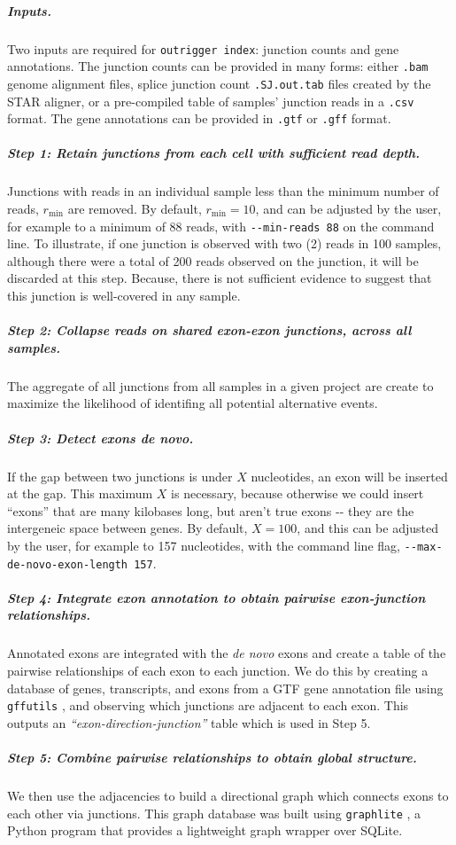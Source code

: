 \subparagraph{Inputs.} Two inputs are required for \texttt{outrigger index}: junction counts and gene annotations. The junction counts can be provided in many forms: either \texttt{.bam} \cite{Group:OEYDIUUE} genome alignment files, splice junction count \texttt{.SJ.out.tab} files created by the STAR aligner\cite{Dobin:2013fg}, or a pre-compiled table of samples' junction reads in a \texttt{.csv} format. The gene annotations can be provided in \texttt{.gtf} or \texttt{.gff} format.

\subparagraph{Step 1: Retain junctions from each cell with sufficient read depth.} Junctions with reads in an individual sample less than the minimum number of reads, $r_{\min}$ are removed. By default, $r_{\min} = 10$, and can be adjusted by the user, for example to a minimum of 88 reads, with \texttt{-{}-min-reads~88} on the command line. To illustrate, if one junction is observed with two (2) reads in 100 samples, although there were a total of 200 reads observed on the junction, it will be discarded at this step. Because, there is not sufficient evidence to suggest that this junction is well-covered in any sample.

\subparagraph{Step 2: Collapse reads on shared exon-exon junctions, across all samples.} The aggregate of all junctions from all samples in a given project are create to maximize the likelihood of identifing all potential alternative events.

\subparagraph{Step 3: Detect exons \emph{de novo}.} If the gap between two junctions is under $X$ nucleotides, an exon will be inserted at the gap. This maximum $X$ is necessary, because otherwise we could insert ``exons'' that are many kilobases long, but aren't true exons -{}- they are the intergeneic space between genes. By default, $X = 100$, and this can be adjusted by the user, for example to 157 nucleotides, with the command line flag, \texttt{-{}-max-de-novo-exon-length~157}.

\subparagraph{Step 4: Integrate exon annotation to obtain pairwise exon-junction relationships.} Annotated exons are integrated with the \emph{de novo} exons and create a table of the pairwise relationships of each exon to each junction. We do this by creating a database of genes, transcripts, and exons from a GTF gene annotation file using \texttt{gffutils} \cite{gffutils:sP8uhXuv}, and observing which junctions are adjacent to each exon. This outputs an \emph{``exon-direction-junction''} table which is used in Step 5.

\subparagraph{Step 5: Combine pairwise relationships to obtain global structure.} We then use the adjacencies to build a directional graph which connects exons to each other via junctions. This graph database was built using \texttt{graphlite} \cite{graphlite:vt}, a Python program that provides a lightweight graph wrapper over SQLite.

